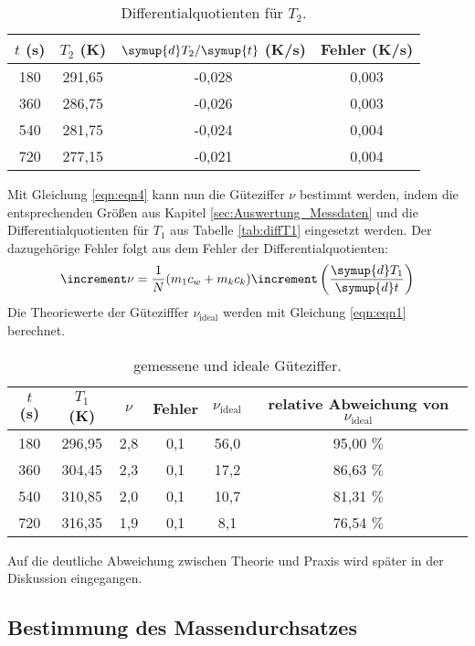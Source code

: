 \begin{table}
  \centering
  \caption{Differentialquotienten für $T_2$.}
  \label{tab:diffT2}
  \begin{tabular}{c c c c}
    \toprule
    $t$ (s) & $T_2$ (K) & $\symup{d}T_2/\symup{t}$ (K/s) & Fehler (K/s) \\
    \midrule
    180 & 291,65 & -0,028 & 0,003 \\
    360 & 286,75 & -0,026 & 0,003 \\
    540 & 281,75 & -0,024 & 0,004 \\
    720 & 277,15 & -0,021 & 0,004 \\
    \bottomrule
  \end{tabular}
\end{table}
\FloatBarrier
\noindent
Mit Gleichung \eqref{eqn:eqn4} kann nun die Güteziffer $\nu$ bestimmt werden, indem die entsprechenden Größen aus Kapitel \ref{sec:Auswertung_Messdaten} und die Differentialquotienten für $T_1$ aus Tabelle \ref{tab:diffT1} eingesetzt werden.
Der dazugehörige Fehler folgt aus dem Fehler der Differentialquotienten:
\begin{equation}
  \increment \nu = \frac{1}{N} (m_1c_w + m_kc_k) \increment \left(\frac{\symup{d}T_1}{\symup{d}t} \right)
  \label{eqn:gl11}
\end{equation}
Die Theoriewerte der Gütezifffer $\nu_{\text{ideal}}$ werden mit Gleichung \eqref{eqn:eqn1} berechnet.
\begin{table}
  \centering
  \caption{gemessene und ideale Güteziffer.}
  \label{tab:guete}
  \begin{tabular}{c c c c c c}
    \toprule
    $t$ (s) & $T_1$ (K) & $\nu$ & Fehler & $\nu_{\text{ideal}}$ & relative Abweichung von $\nu_{\text{ideal}}$ \\
    \midrule
    180 & 296,95 & 2,8 & 0,1 & 56,0 & 95,00 $\%$ \\
    360 & 304,45 & 2,3 & 0,1 & 17,2 & 86,63 $\%$ \\
    540 & 310,85 & 2,0 & 0,1 & 10,7 & 81,31 $\%$ \\
    720 & 316,35 & 1,9 & 0,1 &  8,1 & 76,54 $\%$ \\
    \bottomrule
  \end{tabular}
\end{table}
Auf die deutliche Abweichung zwischen Theorie und Praxis wird später in der Diskussion eingegangen.
\FloatBarrier

\subsection{Bestimmung des Massendurchsatzes}
\label{sec:Auswertung_Massendurchsatz}

